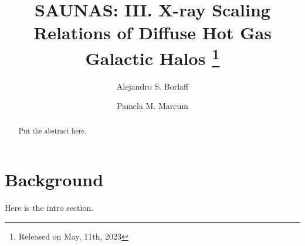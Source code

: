 \documentclass[modern]{CORE-AAS/aastex631}
\begin{document}
\title{\textbf{SAUNAS}: III. X-ray Scaling Relations of Diffuse Hot Gas Galactic Halos \footnote{Released on May, 11th, 2023}}
\author{Alejandro S. Borlaff}
\author{Pamela M. Marcum}

\begin{abstract}
Put the abstract here. 
\end{abstract}

\section{Background}
Here is the intro section.

\begin{acknowledgements}
\end{acknowledgements}
\vspace{5mm}




\end{document}
